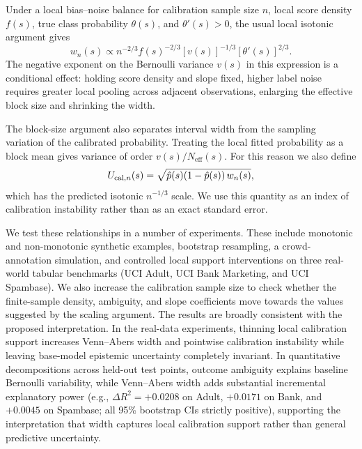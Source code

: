 \documentclass[11pt]{article}
\begin{document}
	Under a local bias--noise balance for calibration sample size $n$, local score density $f(s)$, true class probability $\theta(s)$, and $\theta'(s)>0$, the usual local isotonic argument gives
	\begin{equation}
		w_n(s) \propto n^{-2/3} f(s)^{-2/3}[v(s)]^{-1/3}[\theta'(s)]^{2/3}.
		\label{eq:intro_scaling}
	\end{equation}
	The negative exponent on the Bernoulli variance $v(s)$ in this expression is a conditional effect: holding score density and slope fixed, higher label noise requires greater local pooling across adjacent observations, enlarging the effective block size and shrinking the width.

	The block-size argument also separates interval width from the sampling variation of the calibrated probability. Treating the local fitted probability as a block mean gives variance of order $v(s)/N_{\mathrm{eff}}(s)$. For this reason we also define
	\begin{equation}
		U_{{\rm cal},n}(s) = \sqrt{\hat p(s)(1-\hat p(s))\,w_n(s)},
		\label{eq:intro_ucal}
	\end{equation}
	which has the predicted isotonic $n^{-1/3}$ scale. We use this quantity as an index of calibration instability rather than as an exact standard error.

	We test these relationships in a number of experiments. These include monotonic and non-monotonic synthetic examples, bootstrap resampling, a crowd-annotation simulation, and controlled local support interventions on three real-world tabular benchmarks (UCI Adult, UCI Bank Marketing, and UCI Spambase). We also increase the calibration sample size to check whether the finite-sample density, ambiguity, and slope coefficients move towards the values suggested by the scaling argument. The results are broadly consistent with the proposed interpretation. In the real-data experiments, thinning local calibration support increases Venn--Abers width and pointwise calibration instability while leaving base-model epistemic uncertainty completely invariant. In quantitative decompositions across held-out test points, outcome ambiguity explains baseline Bernoulli variability, while Venn--Abers width adds substantial incremental explanatory power (e.g., $\Delta R^2 = +0.0208$ on Adult, $+0.0171$ on Bank, and $+0.0045$ on Spambase; all 95\% bootstrap CIs strictly positive), supporting the interpretation that width captures local calibration support rather than general predictive uncertainty.
\end{document}
